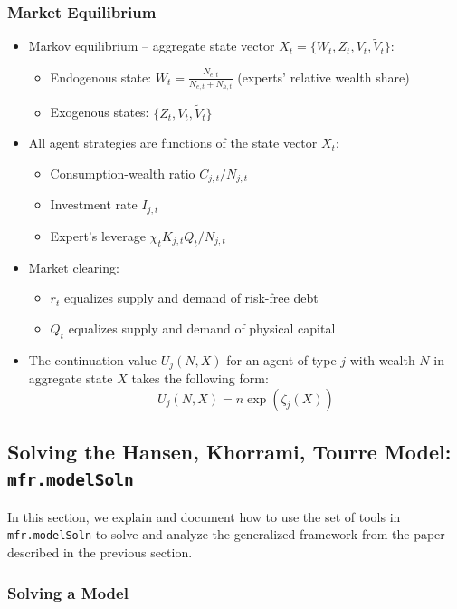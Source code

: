 \documentclass[12pt]{article}
\newcommand{\modelSolnProg}{mfr.modelSoln\xspace}
\begin{document}
\subsubsection{Market Equilibrium}
\begin{itemize}
\item Markov equilibrium -- aggregate state vector $X_t = \{W_t,Z_t, V_t, \widetilde{V}_t\}$:
\begin{itemize}
\item Endogenous state: $W_t = \frac{N_{e,t}}{N_{e,t}+N_{h,t}}$ (experts' relative wealth share)
 \item Exogenous states: $\{Z_t, V_t, \widetilde{V}_t\}$
\end{itemize}
\item All agent strategies are functions of the state vector $X_t$:
\begin{itemize}
 \item Consumption-wealth ratio $C_{j,t} / N_{j,t}$
 \item Investment rate $I_{j,t}$
 \item Expert's leverage $\chi_t K_{j,t} Q_t / N_{j,t}$
\end{itemize}
\item Market clearing:
\begin{itemize}
 \item $r_t$ equalizes supply and demand of risk-free debt
 \item $Q_t$ equalizes supply and demand of physical capital
\end{itemize}
\item The continuation value $U_j(N,X)$ for an agent of type $j$ with wealth $N$ in aggregate state $X$ takes the following form:
$$U_j(N,X) =  n \exp \left( \zeta_j(X) \right)$$

\end{itemize}


\subsection{Solving the Hansen, Khorrami, Tourre Model:  \texttt{\modelSolnProg}}\label{HKTtools}

In this section, we explain and document how to use the set of tools in \texttt{\modelSolnProg} to solve and analyze the generalized framework from
the \citet{HKT} paper described in the previous section. 

\subsubsection{Solving a Model}
\end{document}
